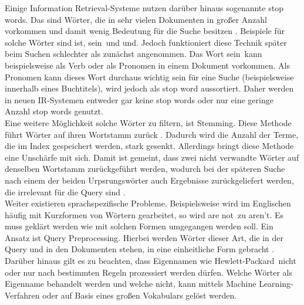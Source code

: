 Einige Information Retrieval-Systeme nutzen darüber hinaus sogenannte \glqq stop words\grqq. Das sind Wörter, die in sehr vielen Dokumenten in großer Anzahl vorkommen und damit wenig Bedeutung für die Suche besitzen \cite{IR_Intro_Cambridge}. Beispiele für solche Wörter sind \glqq ist\grqq, \glqq sein\grqq\ und \glqq und\grqq. Jedoch funktioniert diese Technik später beim Suchen schlechter als zunächst angenommen. Das Wort \glqq sein\grqq\ kann beispielsweise als Verb oder als Pronomen in einem Dokument vorkommen. Als Pronomen kann dieses Wort durchaus wichtig sein für eine Suche (beispielsweise innerhalb eines Buchtitels), wird jedoch als stop word aussortiert. Daher werden in neuen IR-Systemen entweder gar keine stop words oder nur eine geringe Anzahl stop words genutzt\cite[S. 27]{IR_Intro_Cambridge}.
\\
Eine weitere Möglichkeit solche Wörter zu filtern, ist \glqq Stemming\grqq .
Diese Methode führt Wörter auf ihren Wortstamm zurück \cite{IR_Intro_Cambridge} \cite{IR_Uni_Bamberg}. Dadurch wird die Anzahl der Terme, die im Index gespeichert werden, stark gesenkt. Allerdings bringt diese Methode eine Unschärfe mit sich. Damit ist gemeint, dass zwei nicht verwandte Wörter auf denselben Wortstamm zurückgeführt werden, wodurch bei der späteren Suche nach einem der beiden Urpsrungswörter auch Ergebnisse zurückgeliefert werden, die irrelevant für die Query sind \cite{IR_Intro_Cambridge}.
\\
Weiter existieren sprachspezifische Probleme. Beispielsweise wird im Englischen häufig mit Kurzformen von Wörtern gearbeitet, so wird \glqq are not\grqq\ zu \glqq aren't\grqq. Es muss geklärt werden wie mit solchen Formen umgegangen werden soll. Ein Ansatz ist Query Preprocessing. Hierbei werden Wörter dieser Art, die in der Query und in den Dokumenten stehen, in eine einheitliche Form gebracht \cite{IR_Intro_Cambridge}. Darüber hinaus gilt es zu beachten, dass Eigennamen wie \glqq Hewlett-Packard\grqq\ nicht oder nur nach bestimmten Regeln prozessiert werden dürfen. Welche Wörter als Eigenname behandelt werden und welche nicht, kann mittels Machine Learning-Verfahren oder auf Basis eines großen Vokabulars gelöst werden.